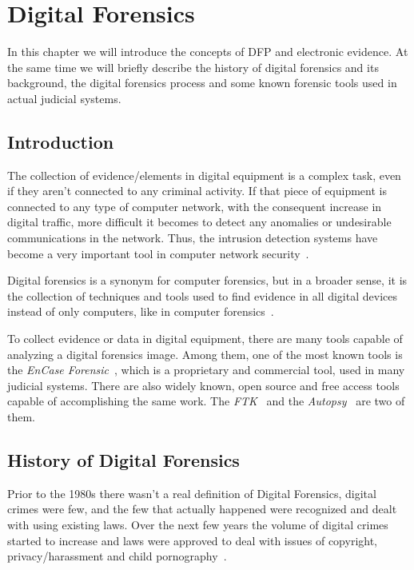 \chapter{Digital Forensics}
In this chapter we will introduce the concepts of \acf{DFP} and electronic evidence. At the same time we will briefly describe the history of digital forensics and its background, the digital forensics process and some known forensic tools used in actual judicial systems.

\section{Introduction}

The collection of evidence/elements in digital equipment is a complex task, even if they aren't connected to any criminal activity. If that piece of equipment is connected to any type of computer network, with the consequent increase in digital traffic, more difficult it becomes to detect any anomalies or undesirable communications in the network. Thus, the intrusion detection systems have become a very important tool in computer network security~\cite{Salgueiro2011}. 

Digital forensics is a synonym for computer forensics, but in a broader sense, it is the collection of techniques and tools used to find evidence in all digital devices instead of only computers, like in computer forensics~\cite{reith2002examination}.

To collect evidence or data in digital equipment, there are many tools capable of analyzing a digital forensics image. Among them, one of the most known tools is the \textit{EnCase Forensic}~\cite{EnCase}, which is a proprietary and commercial tool, used in many judicial systems. There are also widely known, open source and free access tools capable of accomplishing the same work. The \textit{\ac{FTK}}~\cite{FTK} and the \textit{Autopsy}~\cite{Autopsy} are two of them.

\section{History of Digital Forensics}

Prior to the 1980s there wasn't a real definition of Digital Forensics, digital crimes were few, and the few that actually happened were recognized and dealt with using existing laws. Over the next few years the volume of digital crimes started to increase and laws were approved to deal with issues of copyright, privacy/harassment and child pornography~\cite{philipp2009hacking}.

